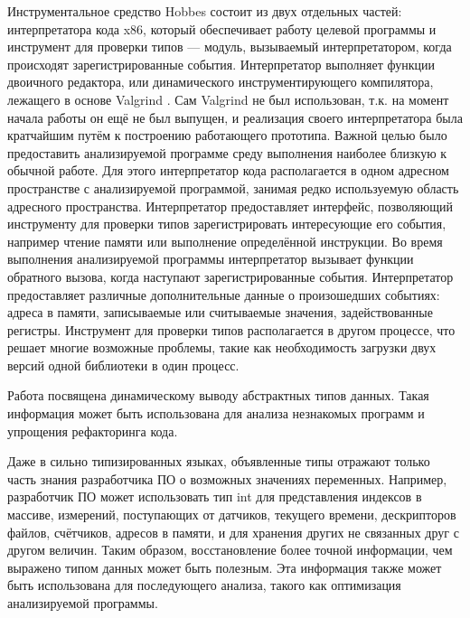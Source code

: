 \documentclass[a4paper,12pt,russian]{article}
\newcommand{\code}[1]{\textsf{#1}}
\begin{document}
Инструментальное средство \code{Hobbes} состоит из двух отдельных частей: интерпретатора кода \code{x86}, который обеспечивает работу целевой программы и инструмент для проверки типов --- модуль, вызываемый интерпретатором, когда происходят зарегистрированные события.
Интерпретатор выполняет функции двоичного редактора, или динамического инструментирующего компилятора, лежащего в основе \code{Valgrind} \cite{valgrind}. Сам \code{Valgrind} не был использован, т.к. на момент начала работы он ещё не был выпущен, и реализация своего интерпретатора была кратчайшим путём к построению работающего прототипа.
Важной целью было предоставить анализируемой программе среду выполнения наиболее близкую к обычной работе.
Для этого интерпретатор кода располагается в одном адресном пространстве с анализируемой программой, занимая редко используемую область адресного пространства.
Интерпретатор предоставляет интерфейс, позволяющий инструменту для проверки типов зарегистрировать интересующие его события, например чтение памяти или выполнение определённой инструкции.
Во время выполнения анализируемой программы интерпретатор вызывает функции обратного вызова, когда наступают зарегистрированные события.
Интерпретатор предоставляет различные дополнительные данные о произошедших событиях: адреса в памяти, записываемые или считываемые значения, задействованные регистры.
Инструмент для проверки типов располагается в другом процессе, что решает многие возможные проблемы, такие как необходимость загрузки двух версий одной библиотеки в один процесс.

Работа \cite{abstracttypes} посвящена динамическому выводу абстрактных типов данных.
Такая информация может быть использована для анализа незнакомых программ и упрощения рефакторинга кода.

Даже в сильно типизированных языках, объявленные типы отражают только часть знания разработчика ПО о возможных значениях переменных.
Например, разработчик ПО может использовать тип \code{int} для представления индексов в массиве, измерений, поступающих от датчиков, текущего времени, дескрипторов файлов, счётчиков, адресов в памяти, и для хранения других не связанных друг с другом величин.
Таким образом, восстановление более точной информации, чем выражено типом данных может быть полезным.
Эта информация также может быть использована для последующего анализа, такого как оптимизация анализируемой программы.
\end{document}
